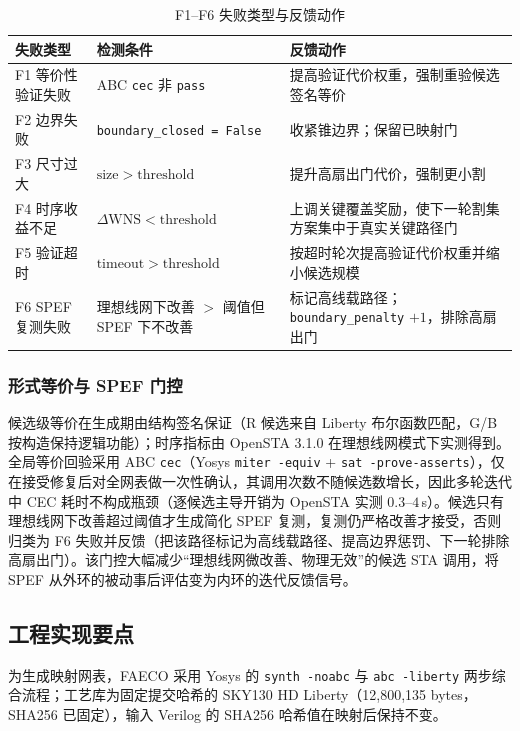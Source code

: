 \documentclass[journal]{IEEEtran}
\begin{document}
\begin{table}[!t]
\centering
\caption{F1--F6 失败类型与反馈动作}
\label{tab:failures}
\scriptsize
\setlength{\tabcolsep}{2pt}
\begin{tabular}{p{2.0cm}p{3.2cm}p{2.9cm}}
\toprule
\textbf{失败类型} & \textbf{检测条件} & \textbf{反馈动作} \\
\midrule
F1 等价性验证失败 & ABC \texttt{cec} 非 \texttt{pass} & 提高验证代价权重，强制重验候选签名等价 \\
F2 边界失败 & \texttt{boundary\_closed = False} & 收紧锥边界；保留已映射门 \\
F3 尺寸过大 & $\mathrm{size} > \mathrm{threshold}$ & 提升高扇出门代价，强制更小割 \\
F4 时序收益不足 & $\Delta\mathrm{WNS} < \mathrm{threshold}$ & 上调关键覆盖奖励，使下一轮割集方案集中于真实关键路径门 \\
F5 验证超时 & $\mathrm{timeout} > \mathrm{threshold}$ & 按超时轮次提高验证代价权重并缩小候选规模 \\
F6 SPEF 复测失败 & 理想线网下改善 $>$ 阈值但 SPEF 下不改善 & 标记高线载路径；\texttt{boundary\_penalty} $+1$，排除高扇出门 \\
\bottomrule
\end{tabular}
\end{table}

\subsubsection{形式等价与 SPEF 门控}
候选级等价在生成期由结构签名保证（R 候选来自 Liberty 布尔函数匹配，G/B 按构造保持逻辑功能）；时序指标由 OpenSTA 3.1.0 在理想线网模式下实测得到。全局等价回验采用 ABC \texttt{cec}（Yosys \texttt{miter -equiv} + \texttt{sat -prove-asserts}），仅在接受修复后对全网表做一次性确认，其调用次数不随候选数增长，因此多轮迭代中 CEC 耗时不构成瓶颈（逐候选主导开销为 OpenSTA 实测 $0.3$--$4\,$s）。候选只有理想线网下改善超过阈值才生成简化 SPEF 复测，复测仍严格改善才接受，否则归类为 F6 失败并反馈（把该路径标记为高线载路径、提高边界惩罚、下一轮排除高扇出门）。该门控大幅减少“理想线网微改善、物理无效”的候选 STA 调用，将 SPEF 从外环的被动事后评估变为内环的迭代反馈信号。

\subsection{工程实现要点}\label{sec:impl}

为生成映射网表，FAECO 采用 Yosys 的 \texttt{synth -noabc} 与 \texttt{abc -liberty} 两步综合流程；工艺库为固定提交哈希的 SKY130 HD Liberty（12,800,135 bytes，SHA256 已固定），输入 Verilog 的 SHA256 哈希值在映射后保持不变。
\end{document}
